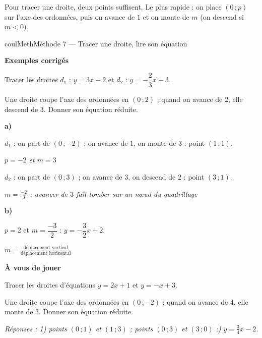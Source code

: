 \documentclass[11pt,a4paper]{article}
\makeatletter
\newcommand{\lycee@repere}[4]{%
  \draw[grille,step=1] (#1,#2) grid (#3,#4);
  \draw[-{Stealth[length=2mm]},thick] (#1,0)--({#3+0.4},0) node[below left=-1pt]{$x$};
  \draw[-{Stealth[length=2mm]},thick] (0,#2)--(0,{#4+0.4}) node[below left=-1pt]{$y$};
  \node[below left,font=\scriptsize,inner sep=1.5pt] at (0,0) {$0$};}
\newcommand{\lycee@gradx}[1]{\foreach \k/\l in {#1}{%
  \draw (\k,0.07)--(\k,-0.07) node[below,font=\scriptsize,inner sep=1.5pt]{$\l$};}}
\newcommand{\lycee@grady}[1]{\foreach \k/\l in {#1}{%
  \draw (0.07,\k)--(-0.07,\k) node[left,font=\scriptsize,inner sep=1.5pt]{$\l$};}}
\providecommand{\repere}{\lycee@repere}%
\providecommand{\gradx}{\lycee@gradx}%
\providecommand{\grady}{\lycee@grady}%
\newcounter{lycee@signet}
\newcommand{\signet}[3][]{\stepcounter{lycee@signet}%
  \edef\lycee@dest{\if\relax\detokenize{#1}\relax
    signet.\arabic{lycee@signet}\else#1\fi}%
  \hypertarget{\lycee@dest}{}\bookmark[level=#2,dest=\lycee@dest]{#3}}
\newcommand{\res}[1]{#1}
\newcounter{methode}
\newenvironment{methodebox}[1][Méthode]{\stepcounter{methode}%
  \begin{boitecours}[phantom={\signet[methode-\arabic{methode}]{2}{#1}}]{coulMeth}{#1}}%
  {\end{boitecours}}
\newcommand{\etape}[1]{\par\smallskip\textbf{\color{coulMeth}#1}\par\nobreak\smallskip}
\newcommand{\reponse}[1]{\par\smallskip
  {\footnotesize\itshape\color{black!55}Réponses : #1}}
\newcommand{\explique}[2]{\par\smallskip\noindent
  \begin{minipage}[t]{0.57\linewidth}\raggedright #1\end{minipage}\hfill
  \begin{minipage}[t]{0.40\linewidth}\raggedright\leavevmode
    {\small\itshape\color{black!60}#2}\end{minipage}\par}
\newcommand{\cas}[1]{\par\smallskip\noindent\textbf{\color{coulExo}#1}\vadjust{\nobreak}}
\newenvironment{correction}{\par}{\par}
\newcommand{\etapeexemples}{\etape{Exemples corrigés}}
\makeatother
\begin{document}
Pour tracer une droite, deux points suffisent. Le plus rapide : on place $(0\,;p)$ sur
l'axe des ordonnées, puis on avance de $1$ et on monte de $m$ (on descend si $m<0$).

\begin{methodebox}[Méthode 7 --- Tracer une droite, lire son équation]
\etapeexemples
\begin{questions}[label=\alph*)]
  \item Tracer les droites $d_{1}$ : $y=3x-2$ et $d_{2}$ : $y=-\dfrac{2}{3}x+3$.
  \item Une droite coupe l'axe des ordonnées en $(0\,;2)$ ; quand on avance de $2$, elle
        descend de $3$. Donner son équation réduite.
\end{questions}
\begin{correction}
\begin{minipage}[c]{0.58\linewidth}\raggedright
\cas{a)}
\explique{$d_{1}$ : on part de $(0\,;-2)$ ; on avance de $1$, on monte de $3$ : point
$(1\,;1)$.}{$p=-2$ et $m=3$}
\explique{$d_{2}$ : on part de $(0\,;3)$ ; on avance de $3$, on descend de $2$ : point
$(3\,;1)$.}{$m=\frac{-2}{3}$ : avancer de $3$ fait tomber sur un nœud du quadrillage}
\cas{b)}
\explique{$p=2$ et $m=\dfrac{-3}{2}$ : $\res{y=-\dfrac{3}{2}x+2}$.}{$m=\frac{\text{déplacement
vertical}}{\text{déplacement horizontal}}$}
\end{minipage}\hfill
\begin{minipage}[c]{0.38\linewidth}\centering
{}
\end{minipage}
\end{correction}

\etape{À vous de jouer}
\begin{questions}
  \item Tracer les droites d'équations $y=2x+1$ et $y=-x+3$.
  \item Une droite coupe l'axe des ordonnées en $(0\,;-2)$ ; quand on avance de $4$, elle
        monte de $3$. Donner son équation réduite.
\end{questions}
\reponse{1\textdegree) points $(0\,;1)$ et $(1\,;3)$ ; points $(0\,;3)$ et $(3\,;0)$ ;\;
2\textdegree) $y=\frac{3}{4}x-2$.}
\end{methodebox}
\end{document}
